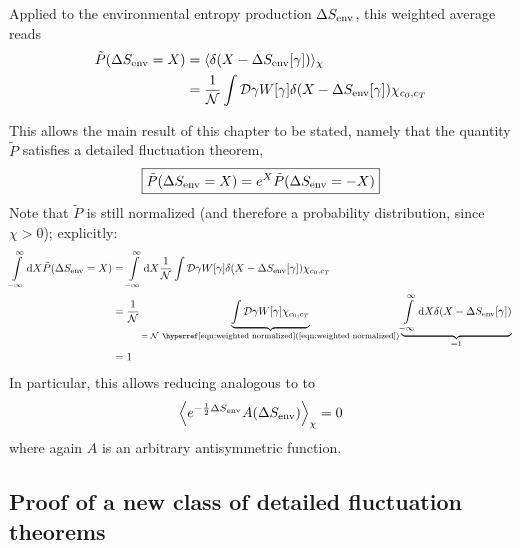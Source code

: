 Applied to the environmental entropy production \(\Delta S_\text{env}\), this weighted average reads
%
\begin{equation}
	\begin{split}
	\label{eqn:P(SEnv)}
	\tilde P(\Delta S_\text{env} = X)
	&= \langle \delta(X-\Delta S_\text{env}[\gamma])\rangle_\chi \\
	&= \frac1{\mathcal{N}} \int\mathcal{D}\gamma W[\gamma] \delta(X-\Delta S_\text{env}[\gamma]) \chi_{c_0,c_T}
	\end{split}
\end{equation}

This allows the main result of this chapter to be stated, namely that the quantity \(\tilde P\) satisfies a detailed fluctuation theorem,
%
\begin{equation}
	\label{eqn:SEnv fluctuation theorem}
	\boxed{
		\tilde P(\Delta S_\text{env} = X) = e^X \tilde P(\Delta S_\text{env} = -X)
	}
\end{equation}
%
Note that \(\tilde P\) is still normalized (and therefore a probability distribution, since \(\chi > 0\)); explicitly:
\begin{equation}
	\begin{split}
	   \inflint\d X \tilde P(\Delta\SEnv = X)
	&= \inflint\d X \frac1{\Cal N} \int\Cal D\gamma W[\gamma] \delta(X-\Delta\SEnv[\gamma]) \chi_{c_0,c_T}
	\\
	&=  \frac1{\Cal N} \underbrace{\int\Cal D\gamma W[\gamma] \chi_{c_0,c_T}}_{=\; \Cal N ~ \text{\RefEqn{eqn:weighted normalized}}}
	    \underbrace{\inflint\d X \delta(X-\Delta\SEnv[\gamma])}_{=1}  \\
	&= 1
	\end{split}
\end{equation}
%
In particular, this allows reducing  analogous to  to
\begin{equation}
	\label{eqn:SEnv asymmetric average}
	\left\langle e^{-\frac12\Delta S_\text{env}} A(\Delta S_\text{env})\right\rangle_\chi = 0
\end{equation}
%
where again \(A\) is an arbitrary antisymmetric function.





\subsection{Proof of a new class of detailed fluctuation theorems}




